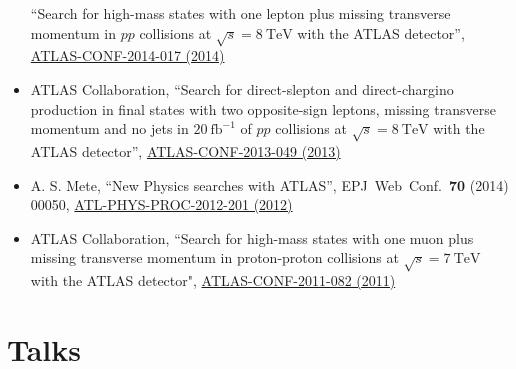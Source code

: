 \documentclass[a4paper,10pt]{article}
\begin{document}
\begin{itemize}
	``Search for high-mass states with one lepton plus missing transverse momentum in $pp$ collisions at $\sqrt{s}= 8\ \mathrm{TeV}$ with the ATLAS detector'',
	\href{https://atlas.web.cern.ch/Atlas/GROUPS/PHYSICS/CONFNOTES/ATLAS-CONF-2014-017/}{ATLAS-CONF-2014-017 (2014)} 
	\item ATLAS Collaboration, 
	``Search for direct-slepton and direct-chargino production in final states with two opposite-sign leptons, missing transverse momentum 
	and no jets in $20\ \mathrm{fb}^{-1}$ of $pp$ collisions at $\sqrt{s} = 8\ \mathrm{TeV}$ with the ATLAS detector'', 
	\href{https://atlas.web.cern.ch/Atlas/GROUPS/PHYSICS/CONFNOTES/ATLAS-CONF-2013-049/}{ATLAS-CONF-2013-049 (2013)} 
	\item A. S. Mete, 
	``New Physics searches with ATLAS'', 
	EPJ\ Web\ Conf.\ {\bf 70} (2014) 00050, 
	\href{https://cds.cern.ch/record/1478973}{ATL-PHYS-PROC-2012-201 (2012)}
	\item ATLAS Collaboration, 
	``Search for high-mass states with one muon plus missing transverse momentum in proton-proton collisions at $\sqrt{s} = 7\ \mathrm{TeV}$ with the ATLAS detector", 
	\href{https://atlas.web.cern.ch/Atlas/GROUPS/PHYSICS/CONFNOTES/ATLAS-CONF-2011-082/}{ATLAS-CONF-2011-082 (2011)}
\end{itemize}

\vspace{3mm}
\section{Talks}
\end{document}
